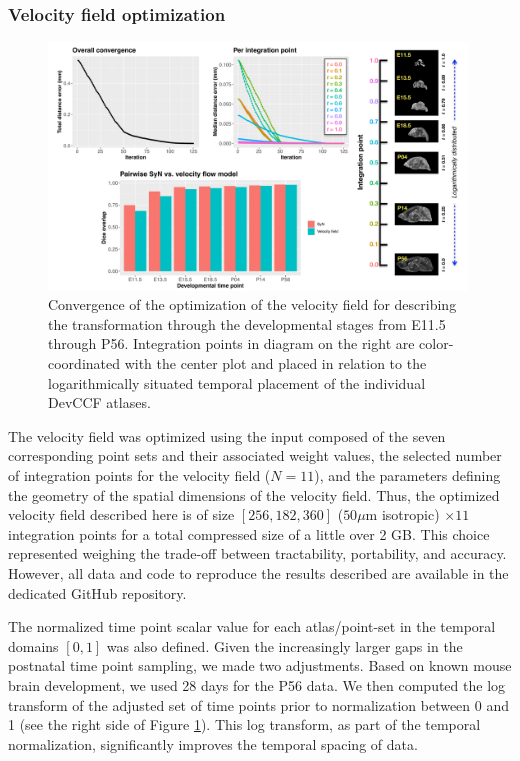 \documentclass[
  12pt,
]{article}
\begin{document}
\subsubsection{Velocity field
optimization}\label{velocity-field-optimization}

\begin{figure}[!htb]
\centering
\includegraphics[width=0.99\textwidth]{Figures/convergence.pdf}
\caption{Convergence of the optimization of the velocity field for describing
the transformation through the developmental stages from E11.5 through P56.
Integration points in diagram on the right are color-coordinated with the center
plot and placed in relation to the logarithmically situated temporal placement
of the individual DevCCF atlases.}
\label{fig:convergence}
\end{figure}

The velocity field was optimized using the input composed of the seven
corresponding point sets and their associated weight values, the
selected number of integration points for the velocity field (\(N=11\)),
and the parameters defining the geometry of the spatial dimensions of
the velocity field. Thus, the optimized velocity field described here is
of size \([256, 182, 360]\) (\(50
\mu\)m isotropic) \(\times 11\) integration points for a total
compressed size of a little over 2 GB. This choice represented weighing
the trade-off between tractability, portability, and accuracy. However,
all data and code to reproduce the results described are available in
the dedicated GitHub repository.

The normalized time point scalar value for each atlas/point-set in the
temporal domains \([0, 1]\) was also defined. Given the increasingly
larger gaps in the postnatal time point sampling, we made two
adjustments. Based on known mouse brain development, we used 28 days for
the P56 data. We then computed the log transform of the adjusted set of
time points prior to normalization between 0 and 1 (see the right side
of Figure \ref{fig:convergence}). This log transform, as part of the
temporal normalization, significantly improves the temporal spacing of
data.
\end{document}

